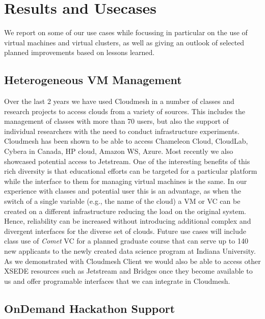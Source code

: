

\section{Results and Usecases} \label{S:results}

We report on some of our use cases while focussing in particular on
the use of virtual machines and virtual clusters, as well as giving an
outlook of selected planned improvements based on lessons learned.

\subsection{Heterogeneous VM Management}

Over the last 2 years we have used Cloudmesh in a number of classes
and research projects to access clouds from a variety of sources. This
includes the management of classes with more than 70 users, but also
the support of individual researchers with the need to conduct
infrastructure experiments. Cloudmesh has been shown to be able to
access Chameleon Cloud, CloudLab, Cybera in Canada, HP cloud, Amazon
WS, Azure. Most recently we also showcased potential access to
Jetstream. One of the interesting benefits of this rich diversity is
that educational efforts can be targeted for a particular platform
while the interface to them for managing virtual machines is the same.
In our experience with classes and potential user this is
an advantage, as when the switch of a single variable (e.g., the
name of the cloud) a VM or VC can be created on
a different infrastructure reducing the load on the original
system. Hence, reliability can be increased without introducing
additional complex and divergent interfaces for the diverse set of
clouds. Future use cases will include class use of {\em Comet\/} VC
for a planned graduate course that can serve up to 140 new
applicants to the newly created data science program at Indiana
University. As we demonstrated with Cloudmesh Client we would also be
able to access other XSEDE resources such as Jetstream and Bridges
once they become available to us and offer programable interfaces that
we can integrate in Cloudmesh.

\subsection{OnDemand Hackathon Support}

